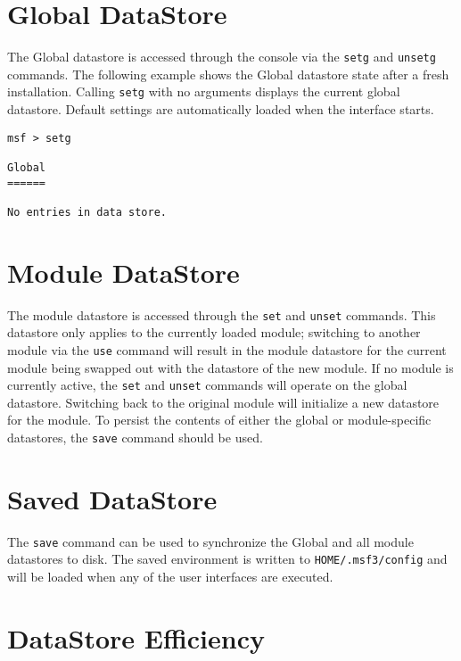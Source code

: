 \documentclass{report}
\begin{document}
    \section{Global DataStore}
    \label{ENV-GLOBAL}
\par
The Global datastore is accessed through the console via the \texttt{setg} and
\texttt{unsetg} commands. The following example shows the Global datastore
state after a fresh installation. Calling \texttt{setg} with no arguments
displays the current global datastore. Default settings are automatically
loaded when the interface starts.

\begin{verbatim}
msf > setg

Global
======

No entries in data store.

\end{verbatim}

    \section{Module DataStore}
    \label{ENV-TEMP}
\par

The module datastore is accessed through the \texttt{set} and \texttt{unset}
commands. This datastore only applies to the currently loaded module;
switching to another module via the \texttt{use} command will result in the
module datastore for the current module being swapped out with the datastore
of the new module. If no module is currently active, the \texttt{set} and
\texttt{unset} commands will operate on the global datastore. Switching back
to the original module will initialize a new datastore for the module.  To
persist the contents of either the global or module-specific datastores, the
\texttt{save} command should be used.

    \section{Saved DataStore}
    \label{ENV-SAVE}

\par
The \texttt{save} command can be used to synchronize the Global and all module
datastores to disk. The saved environment is written to
\texttt{HOME/.msf3/config} and will be loaded when any of the user interfaces
are executed.  

    \section{DataStore Efficiency}
    \label{ENV-EFF}
\end{document}
